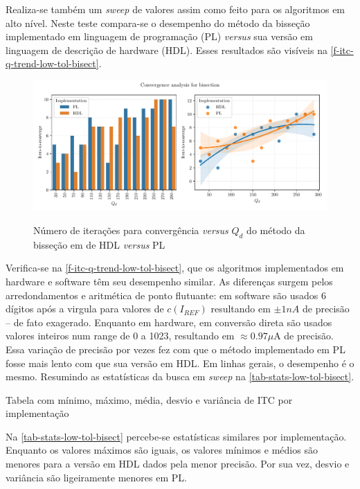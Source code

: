Realiza-se também um \textit{sweep} de valores assim como feito para os algoritmos em alto nível. Neste teste compara-se o desempenho do método da bisseção implementado em linguagem de programação (PL) \textit{versus} sua versão em linguagem de descrição de hardware (HDL). Esses resultados são visíveis na \autoref{f-itc-q-trend-low-tol-bisect}.


\begin{figure}[H]
    \centering
    \caption{Número de iterações para convergência \textit{versus} $Q_d$ do método da bisseção em de HDL \textit{versus} PL}
    \includegraphics{fig/conv-analysis-no-drop-bisect.pdf}
    \label{f-itc-q-trend-low-tol-bisect}
\end{figure}

Verifica-se na \autoref{f-itc-q-trend-low-tol-bisect}, que os algoritmos implementados em hardware e software têm seu desempenho similar. As diferenças surgem pelos arredondamentos e aritmética de ponto flutuante: em software são usados 6 dígitos após a virgula para valores de $c (I_{REF})$ resultando em $\pm 1nA$ de precisão -- de fato exagerado. Enquanto em hardware, em conversão direta são usados valores inteiros num range de 0 a 1023, resultando em $\approx 0.97\mu$A de precisão. Essa variação de precisão por vezes fez com que o método implementado em PL fosse mais lento com que sua versão em HDL. Em linhas gerais, o desempenho é o mesmo. Resumindo as estatísticas da busca em \textit{sweep} na \autoref{tab-stats-low-tol-bisect}.

\begin{table}[H]
    \centering
    \caption{Tabela com mínimo, máximo, média, desvio e variância de ITC por implementação}
        
    \label{tab-stats-low-tol-bisect}
\end{table}

Na \autoref{tab-stats-low-tol-bisect} percebe-se estatísticas similares por implementação. Enquanto os valores máximos são iguais, os valores mínimos e médios são menores para a versão em HDL dados pela menor precisão. Por sua vez, desvio e variância são ligeiramente menores em PL.

